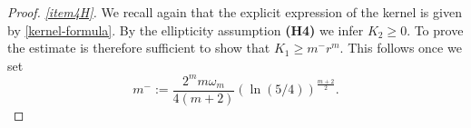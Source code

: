 \documentclass[10pt,a4paper]{amsart}
\begin{document}
\begin{proof}
	
	\medskip
	\emph{\ref{item4H}.} We recall again that the explicit expression of the kernel is given by \eqref{kernel-formula}. By the ellipticity assumption \textbf{(H4)} we infer $K_2\geq0$. To prove the estimate is therefore sufficient to show that $K_1\geq m^-r^m$. This follows once we set  
	\begin{equation}
		m^-:=\frac{2^mm\omega_m}{4(m+2)}\left(\ln(5/4) \right)^\frac{m+2}{2}.
	\end{equation}
\end{proof}
\end{document}
